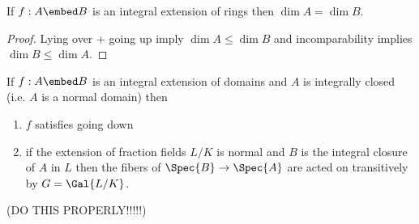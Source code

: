 \documentclass[12pt]{article}
\begin{document}
\begin{cor}
If $f : A \embed B$ is an integral extension of rings then $\dim{A} = \dim{B}$.
\end{cor}

\begin{proof}
Lying over + going up imply $\dim{A} \le \dim{B}$ and incomparability implies $\dim{B} \le \dim{A}$. 
\end{proof}

\begin{prop} 
If $f : A \embed B$ is an integral extension of domains and $A$ is integrally closed (i.e. $A$ is a normal domain) then
\begin{enumerate}
\item $f$ satisfies going down
\item if the extension of fraction fields $L / K$ is normal and $B$ is the integral closure of $A$ in $L$ then the fibers of $\Spec{B} \to \Spec{A}$ are acted on transitively by $G = \Gal{L/K}$.
\end{enumerate}
\end{prop}

(DO THIS PROPERLY!!!!!)
\end{document}
